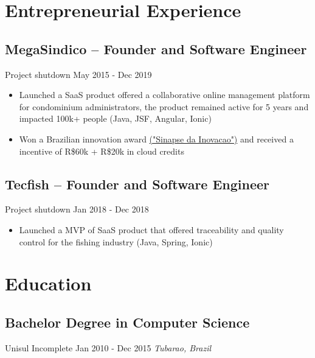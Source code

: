 \documentclass[11pt, a4paper]{article}
\begin{document}
\section*{Entrepreneurial Experience}
\subsection*{MegaSindico -- Founder and Software Engineer}
Project shutdown \hfill May 2015 - Dec 2019
\begin{itemize}[noitemsep]
    \item Launched a SaaS product offered a collaborative online management platform for condominium administrators, the product remained active for 5 years and impacted 100k+ people (Java, JSF, Angular, Ionic)
    \item Won a Brazilian innovation award \href{https://certi.org.br/pt/cases-sinapse-da-inovacao}{("Sinapse da Inovacao")} and received a incentive of R\$60k + R\$20k in cloud credits
\end{itemize}

\subsection*{Tecfish -- Founder and Software Engineer}
Project shutdown \hfill Jan 2018 - Dec 2018
\begin{itemize}[noitemsep]
    \item Launched a MVP of SaaS product that offered traceability and quality control for the fishing industry (Java, Spring, Ionic)
\end{itemize}

\section*{Education}
\subsection*{Bachelor Degree in Computer Science}
Unisul \hfill Incomplete \hfill Jan 2010 - Dec 2015
\textit{Tubarao, Brazil}
\end{document}

